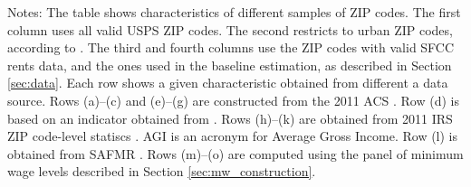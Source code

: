 \begin{table}[hbt!]
    \begin{minipage}{.95\textwidth} \footnotesize
        \vspace{2mm}
        Notes: The table shows characteristics of different samples of ZIP codes.
        The first column uses all valid USPS ZIP codes.
        The second restricts to urban ZIP codes, according to \textcite{MissouriCDC}.
        The third and fourth columns use the ZIP codes with valid SFCC rents 
        data, and the ones used in the baseline estimation, as described in
        Section \ref{sec:data}.
        Each row shows a given characteristic obtained from different a data 
        source.
        Rows (a)--(c) and (e)--(g) are constructed from the 2011 ACS 
        \textcite{ACS}.
        Row (d) is based on an indicator obtained from \textcite{MissouriCDC}.
        Rows (h)--(k) are obtained from 2011 IRS ZIP code-level statiscs 
        \textcite{IRS}.
        AGI is an acronym for Average Gross Income.
        Row (l) is obtained from SAFMR \textcite{hudSAFMR}.
        Rows (m)--(o) are computed using the panel of minimum wage levels 
        described in Section \ref{sec:mw_construction}.
    \end{minipage}
\end{table}
